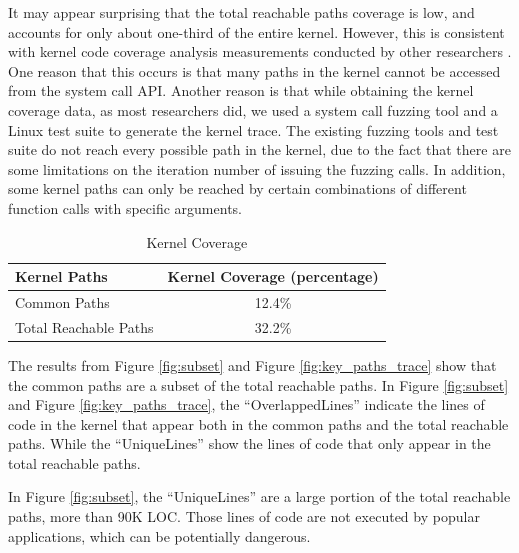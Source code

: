 It may appear surprising that the total reachable paths coverage is low, 
and accounts for only about one-third of the entire kernel.  However, 
this is consistent with kernel code coverage analysis 
measurements conducted by other researchers \cite{LTP-Coverage}.
One reason that this occurs is that many paths 
in the kernel cannot be accessed from the system call API. Another reason
is that 
while obtaining the kernel coverage data, as most researchers did, we used
a system call fuzzing tool 
and a Linux test suite to generate the kernel trace. The existing fuzzing
tools and test suite do not reach every possible path in the kernel, due to 
the fact that there are some limitations on the iteration number of issuing  
the fuzzing calls. In addition, some kernel paths can only be reached by 
certain combinations of different function calls with specific arguments. 


\begin{table}
\centering
\scriptsize
\caption {Kernel Coverage}
\begin{tabular}{|l|c|}
  \hline
  \textbf{Kernel Paths} & \textbf{Kernel Coverage (percentage)} \\
  \hline \hline
  Common Paths & 12.4\% \\
  \hline
  Total Reachable Paths & 32.2\% \\
  \hline
\end{tabular}
\label{table:kernel_coverage}
\end{table}

The results from Figure \ref{fig:subset} and Figure
\ref{fig:key_paths_trace} 
show that the common paths are a subset of the
total reachable paths. 
In Figure \ref{fig:subset} and Figure \ref{fig:key_paths_trace}, 
the ``OverlappedLines'' indicate the lines of code 
in the kernel that appear both in the common paths and the total reachable 
paths. While the ``UniqueLines'' show the lines of code that only appear in 
the total reachable paths.

In Figure \ref{fig:subset}, the ``UniqueLines'' 
are a large portion of the total reachable paths, more than 90K LOC. 
Those lines of code are not executed by popular applications, which can be 
potentially dangerous. 

